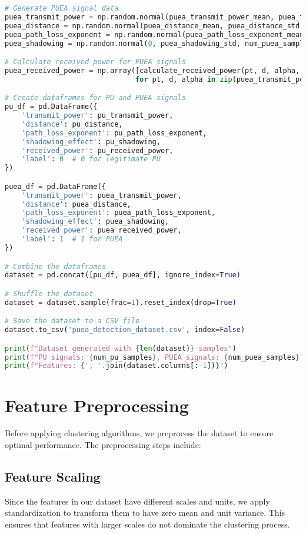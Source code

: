 \begin{lstlisting}[language=Python, caption=Dataset Generation Code]
# Generate PUEA signal data
puea_transmit_power = np.random.normal(puea_transmit_power_mean, puea_transmit_power_std, num_puea_samples)
puea_distance = np.random.normal(puea_distance_mean, puea_distance_std, num_puea_samples)
puea_path_loss_exponent = np.random.normal(puea_path_loss_exponent_mean, puea_path_loss_exponent_std, num_puea_samples)
puea_shadowing = np.random.normal(0, puea_shadowing_std, num_puea_samples)

# Calculate received power for PUEA signals
puea_received_power = np.array([calculate_received_power(pt, d, alpha, puea_shadowing_std) 
                               for pt, d, alpha in zip(puea_transmit_power, puea_distance, puea_path_loss_exponent)])

# Create dataframes for PU and PUEA signals
pu_df = pd.DataFrame({
    'transmit_power': pu_transmit_power,
    'distance': pu_distance,
    'path_loss_exponent': pu_path_loss_exponent,
    'shadowing_effect': pu_shadowing,
    'received_power': pu_received_power,
    'label': 0  # 0 for legitimate PU
})

puea_df = pd.DataFrame({
    'transmit_power': puea_transmit_power,
    'distance': puea_distance,
    'path_loss_exponent': puea_path_loss_exponent,
    'shadowing_effect': puea_shadowing,
    'received_power': puea_received_power,
    'label': 1  # 1 for PUEA
})

# Combine the dataframes
dataset = pd.concat([pu_df, puea_df], ignore_index=True)

# Shuffle the dataset
dataset = dataset.sample(frac=1).reset_index(drop=True)

# Save the dataset to a CSV file
dataset.to_csv('puea_detection_dataset.csv', index=False)

print(f"Dataset generated with {len(dataset)} samples")
print(f"PU signals: {num_pu_samples}, PUEA signals: {num_puea_samples}")
print(f"Features: {', '.join(dataset.columns[:-1])}")
\end{lstlisting}

\section{Feature Preprocessing}
Before applying clustering algorithms, we preprocess the dataset to ensure optimal performance. The preprocessing steps include:

\subsection{Feature Scaling}
Since the features in our dataset have different scales and units, we apply standardization to transform them to have zero mean and unit variance. This ensures that features with larger scales do not dominate the clustering process.

